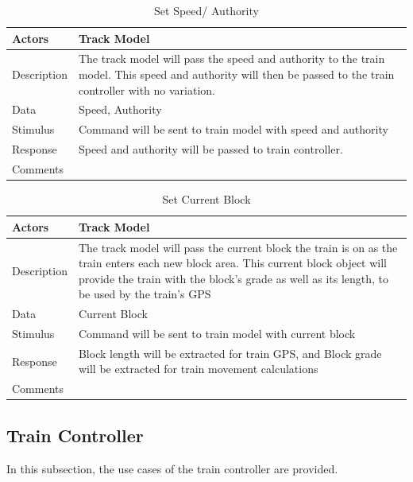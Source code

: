 \documentclass[]{article}
\begin{document}
   \begin{table}[H]
   	\centering
   	\caption{Set Speed/ Authority}
   	\begin{tabular}{|l|l|}
   		\hline
   		Actors & \parbox[t]{10cm}{Track Model} \\ \hline
   		Description & \parbox[t]{10cm}{The track model will pass the speed and authority to the train model. This speed and authority will then be passed to the train controller with no variation.} \\ \hline
   		Data &  \parbox[t]{10cm}{ Speed, Authority} \\ \hline
   		Stimulus &  \parbox[t]{10cm}{Command will be sent to train model with speed and authority} \\ \hline
   		Response & \parbox[t]{10cm}{Speed and authority will be passed to train controller.}\\ \hline
   		Comments & \parbox[t]{10cm}{ }  \\ \hline
   	\end{tabular}
   \end{table}
   
   \begin{table}[H]
   	\centering
   	\caption{Set Current Block}
   	\begin{tabular}{|l|l|}
   		\hline
   		Actors & \parbox[t]{10cm}{Track Model} \\ \hline
   		Description & \parbox[t]{10cm}{The track model will pass the current block the train is on as the train enters each new block area. This current block object will provide the train with the block's grade as well as its length, to be used by the train's GPS } \\ \hline
   		Data &  \parbox[t]{10cm}{Current Block} \\ \hline
   		Stimulus &  \parbox[t]{10cm}{Command will be sent to train model with current block } \\ \hline
   		Response & \parbox[t]{10cm}{Block length will be extracted for train GPS, and Block grade will be extracted for train movement calculations}\\ \hline
   		Comments & \parbox[t]{10cm}{ }  \\ \hline
   	\end{tabular}
   \end{table}

\subsection{Train Controller}
In this subsection, the use cases of the train controller are provided.
\end{document}
